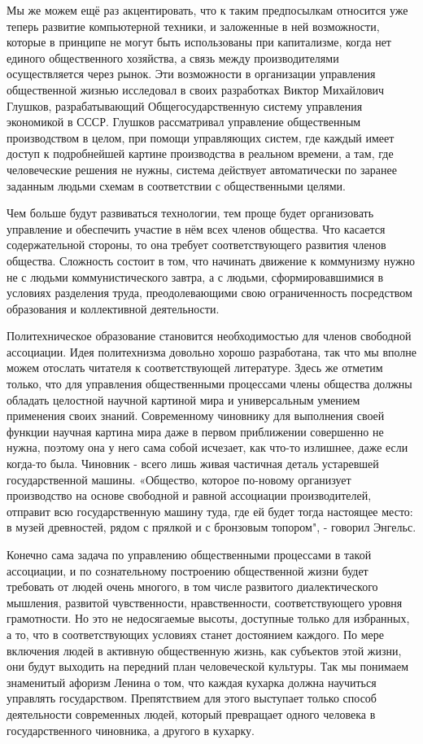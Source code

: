 \documentclass[../main]{subfiles}
\begin{document}
Мы же можем ещё раз акцентировать, что к таким предпосылкам относится уже теперь развитие компьютерной техники, и заложенные в ней возможности, которые в принципе не могут быть использованы при капитализме, когда нет единого общественного хозяйства, а связь между производителями осуществляется через рынок. Эти возможности в организации управления общественной жизнью исследовал в своих разработках Виктор Михайлович Глушков, разрабатывающий Общегосударственную систему управления экономикой в СССР. Глушков рассматривал управление общественным производством в целом, при помощи управляющих систем, где каждый имеет доступ к подробнейшей картине производства в реальном времени, а там, где человеческие решения не нужны, система действует автоматически по заранее заданным людьми схемам в соответствии с общественными целями.

Чем больше будут развиваться технологии, тем проще будет организовать управление и обеспечить участие в нём всех членов общества. Что касается содержательной стороны, то она требует соответствующего развития членов общества. Сложность состоит в том, что начинать движение к коммунизму нужно не с людьми коммунистического завтра, а с людьми, сформировавшимися в условиях разделения труда, преодолевающими свою ограниченность посредством образования и коллективной деятельности.

Политехническое образование становится необходимостью для членов свободной ассоциации. Идея политехнизма довольно хорошо разработана, так что мы вполне можем отослать читателя к соответствующей литературе. Здесь же отметим только, что для управления общественными процессами члены общества должны обладать целостной научной картиной мира и универсальным умением применения своих знаний. Современному чиновнику для выполнения своей функции научная картина мира даже в первом приближении совершенно не нужна, поэтому она у него сама собой исчезает, как что-то излишнее, даже если когда-то была. Чиновник - всего лишь живая частичная деталь устаревшей государственной машины. «Общество, которое по-новому организует производство на основе свободной и равной ассоциации производителей, отправит всю государственную машину туда, где ей будет тогда настоящее место: в музей древностей, рядом с прялкой и с бронзовым топором", - говорил Энгельс.

Конечно сама задача по управлению общественными процессами в такой ассоциации, и по сознательному построению общественной жизни будет требовать от людей очень многого, в том числе развитого диалектического мышления, развитой чувственности, нравственности, соответствующего уровня грамотности. Но это не недосягаемые высоты, доступные только для избранных, а то, что в соответствующих условиях станет достоянием каждого. По мере включения людей в активную общественную жизнь, как субъектов этой жизни, они будут выходить на передний план человеческой культуры. Так мы понимаем знаменитый афоризм Ленина о том, что каждая кухарка должна научиться управлять государством. Препятствием для этого выступает только способ деятельности современных людей, который превращает одного человека в государственного чиновника, а другого в кухарку.
\end{document}
